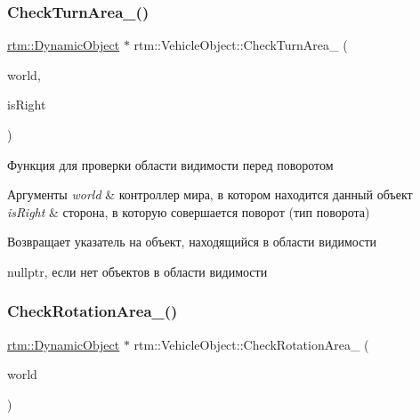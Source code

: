 \subsubsection{\texorpdfstring{Check\+Turn\+Area\+\_\+()}{CheckTurnArea\_()}}
{\footnotesize\ttfamily \hyperlink{classrtm_1_1_dynamic_object}{rtm\+::\+Dynamic\+Object} $\ast$ rtm\+::\+Vehicle\+Object\+::\+Check\+Turn\+Area\+\_\+ (\begin{DoxyParamCaption}\item[{\hyperlink{classrtm_1_1_world_controller}{World\+Controller} $\ast$const}]{world,  }\item[{bool}]{is\+Right }\end{DoxyParamCaption})\hspace{0.3cm}{\ttfamily [protected]}}

Функция для проверки области видимости перед поворотом 
\begin{DoxyParams}{Аргументы}
{\em world} & контроллер мира, в котором находится данный объект \\
\hline
{\em is\+Right} & сторона, в которую совершается поворот (тип поворота) \\
\hline
\end{DoxyParams}
\begin{DoxyReturn}{Возвращает}
указатель на объект, находящийся в области видимости 

nullptr, если нет объектов в области видимости 
\end{DoxyReturn}
\mbox{\label{classrtm_1_1_vehicle_object_a377af8433f7cd5cf99d8ab432dbc4e44}} 
\subsubsection{\texorpdfstring{Check\+Rotation\+Area\+\_\+()}{CheckRotationArea\_()}}
{\footnotesize\ttfamily \hyperlink{classrtm_1_1_dynamic_object}{rtm\+::\+Dynamic\+Object} $\ast$ rtm\+::\+Vehicle\+Object\+::\+Check\+Rotation\+Area\+\_\+ (\begin{DoxyParamCaption}\item[{\hyperlink{classrtm_1_1_world_controller}{World\+Controller} $\ast$const}]{world }\end{DoxyParamCaption})\hspace{0.3cm}{\ttfamily [protected]}}

